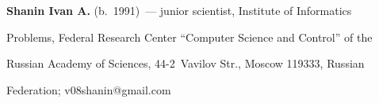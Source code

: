 \vspace*{3pt}



\noindent

    \textbf{Shanin Ivan A.} (b.\ 1991)~--- junior scientist, Institute of Informatics 

Problems, Federal Research Center ``Computer Science and Control'' of the 

Russian Academy of Sciences, 44-2~Vavilov Str., Moscow 119333, Russian 

Federation; \mbox{v08shanin@gmail.com}





\label{end\stat}



\renewcommand{\bibname}{\protect\rm Литература}

